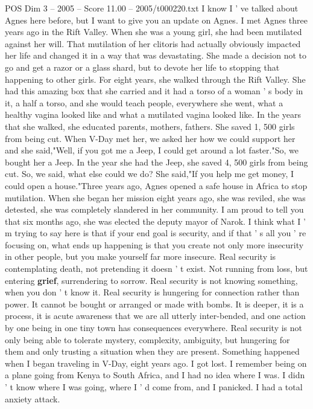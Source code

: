 \begin{textsample}{POS Dim 3 – 2005 – Score 11.00 – 2005/t000220.txt}
I know I ' ve talked about Agnes here before, but I want to give you an update on Agnes.
I met Agnes three years ago in the Rift Valley.
When she was a young girl, she had been mutilated against her will.
That mutilation of her clitoris had actually obviously impacted her life and changed it in a way that was devastating.
She made a decision not to go and get a razor or a glass shard, but to devote her life to stopping that happening to other girls.
For eight years, she walked through the Rift Valley.
She had this amazing box that she carried and it had a torso of a woman ' s body in it, a half a torso, and she would teach people, everywhere she went, what a healthy vagina looked like and what a mutilated vagina looked like.
In the years that she walked, she educated parents, mothers, fathers.
She saved 1, 500 girls from being cut.
When V-Day met her, we asked her how we could support her and she said,"Well, if you got me a Jeep, I could get around a lot faster."So, we bought her a Jeep.
In the year she had the Jeep, she saved 4, 500 girls from being cut.
So, we said, what else could we do?
She said,"If you help me get money, I could open a house."Three years ago, Agnes opened a safe house in Africa to stop mutilation.
When she began her mission eight years ago, she was reviled, she was detested, she was completely slandered in her community.
I am proud to tell you that six months ago, she was elected the deputy mayor of Narok.
I think what I ' m trying to say here is that if your end goal is security, and if that ' s all you ' re focusing on, what ends up happening is that you create not only more insecurity in other people, but you make yourself far more insecure.
Real security is contemplating death, not pretending it doesn ' t exist.
Not running from loss, but entering \textbf{grief}, surrendering to sorrow.
Real security is not knowing something, when you don ' t know it.
Real security is hungering for connection rather than power.
It cannot be bought or arranged or made with bombs.
It is deeper, it is a process, it is acute awareness that we are all utterly inter-bended, and one action by one being in one tiny town has consequences everywhere.
Real security is not only being able to tolerate mystery, complexity, ambiguity, but hungering for them and only trusting a situation when they are present.
Something happened when I began traveling in V-Day, eight years ago.
I got lost.
I remember being on a plane going from Kenya to South Africa, and I had no idea where I was.
I didn ' t know where I was going, where I ' d come from, and I panicked.
I had a total anxiety attack.

\end{textsample}
